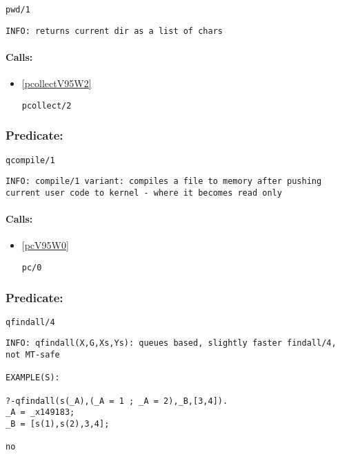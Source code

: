 \begin{verbatim}
pwd/1
\end{verbatim}

{\small \begin{verbatim}
INFO: returns current dir as a list of chars

\end{verbatim}}
\paragraph{Calls:} 
\begin{itemize}
\item \ref{pcollectV95W2} 
\begin{verbatim}
pcollect/2
\end{verbatim}

\end{itemize}

\subsubsection{Predicate:} \label{qcompileV95W1}

\begin{verbatim}
qcompile/1
\end{verbatim}

{\small \begin{verbatim}
INFO: compile/1 variant: compiles a file to memory after pushing current user code to kernel - where it becomes read only

\end{verbatim}}
\paragraph{Calls:} 
\begin{itemize}
\item \ref{pcV95W0} 
\begin{verbatim}
pc/0
\end{verbatim}

\end{itemize}

\subsubsection{Predicate:} \label{qfindallV95W4}

\begin{verbatim}
qfindall/4
\end{verbatim}

{\small \begin{verbatim}
INFO: qfindall(X,G,Xs,Ys): queues based, slightly faster findall/4, not MT-safe

EXAMPLE(S):

?-qfindall(s(_A),(_A = 1 ; _A = 2),_B,[3,4]).
_A = _x149183;
_B = [s(1),s(2),3,4];

no

\end{verbatim}}
